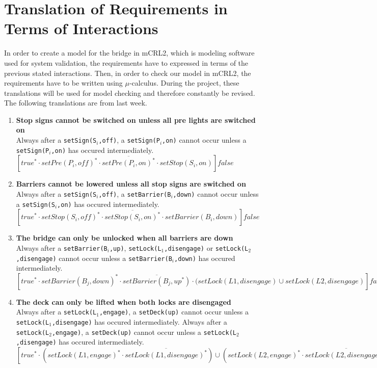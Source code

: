 \section{Translation of Requirements in Terms of Interactions}

In order to create a model for the bridge in mCRL2, which is modeling software used for system validation, the requirements have to expressed in terms of the previous stated interactions. Then, in order to check our model in mCRL2, the requirements have to be written using $\mu$-calculus. During the project, these translations will be used for model checking and therefore constantly be revised. The following translations are from last week.

\begin{enumerate}
	\item \textbf{Stop signs cannot be switched on unless all pre lights are switched on}\\
	Always after a \texttt{setSign(S$_i$,off)}, a \texttt{setSign(P$_i$,on)} cannot occur unless a \texttt{setSign(P$_i$,on)} has occured intermediately.\\
	$[true^* \cdot setPre(P_i, off)^{*} \cdot \overline{setPre(P_i, on)^{*}} \cdot setStop(S_i, on)]false$
	
	\item \textbf{Barriers cannot be lowered unless all stop signs are switched on}\\
	Always after a \texttt{setSign(S$_i$,off)}, a \texttt{setBarrier(B$_i$,down)} cannot occur unless a \texttt{setSign(S$_i$,on)} has occured intermediately.\\
	$[true^* \cdot setStop(S_i, off)^{*} \cdot \overline{setStop(S_i, on)^{*}} \cdot setBarrier(B_i, down)]false$

	\item \textbf{The bridge can only be unlocked when all barriers are down}\\
	Always after a \texttt{setBarrier(B$_i$,up)}, \texttt{setLock(L$_1$,disengage)} or \texttt{setLock(L$_2$,disengage)} cannot occur unless a \texttt{setBarrier(B$_i$,down)} has occured intermediately.\\
	$[true^* \cdot setBarrier(B_j, down)^{*} \cdot \overline{setBarrier(B_j, up^{*})} \cdot (setLock(L1, disengage) \cup setLock(L2, disengage)]false$

	\item	\textbf{The deck can only be lifted when both locks are disengaged}\\
	Always after a \texttt{setLock(L$_1$,engage)}, a \texttt{setDeck(up)} cannot occur unless a \texttt{setLock(L$_1$,disengage)} has occured intermediately. 
	Always after a \texttt{setLock(L$_2$,engage)}, a \texttt{setDeck(up)} cannot occur unless a \texttt{setLock(L$_2$,disengage)} has occured intermediately.\\
	$[true^* \cdot (setLock(L1, engage)^{*} \cdot \overline{setLock(L1, disengage)^{*}}) \cup (setLock(L2, 	engage)^{*} \cdot \overline{setLock(L2, disengage)^{*}}) \cdot setDeck(up)]false$


\end{enumerate}
